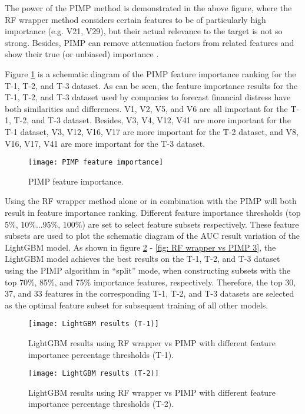 \documentclass[review]{elsarticle}
\begin{document}
The power of the PIMP method is demonstrated in the above figure, where the RF wrapper method considers certain features to be of particularly high importance (e.g. V21, V29), but their actual relevance to the target is not so strong. Besides, PIMP can remove attenuation factors from related features and show their true (or unbiased) importance \citep{Altmann2010}.

Figure \ref{fig: PIMP Feature Importance} is a schematic diagram of the PIMP feature importance ranking for the T-1, T-2, and T-3 dataset. As can be seen, the feature importance results for the T-1, T-2, and T-3 dataset used by companies to forecast financial distress have both similarities and differences. V1, V2, V5, and V6 are all important for the T-1, T-2, and T-3 dataset. Besides, V3, V4, V12, V41 are more important for the T-1 dataset, V3, V12, V16, V17 are more important for the T-2 dataset, and V8, V16, V17, V41 are more important for the T-3 dataset.

\begin{figure}[H]
    \centering
    \texttt{[image: PIMP feature importance]}
    \caption{PIMP feature importance.}
    \label{fig: PIMP Feature Importance}
\end{figure}

Using the RF wrapper method alone or in combination with the PIMP will both result in feature importance ranking. Different feature importance thresholds (top 5\%, 10\%...95\%, 100\%) are set to select feature subsets respectively. These feature subsets are used to plot the schematic diagram of the AUC result variation of the LightGBM model. As shown in figure \ref{fig: RF wrapper vs PIMP 1} - \ref{fig: RF wrapper vs PIMP 3}, the LightGBM model achieves the best results on the T-1, T-2, and T-3 dataset using the PIMP algorithm in ``split'' mode, when constructing subsets with the top 70\%, 85\%, and 75\% importance features, respectively. Therefore, the top 30, 37, and 33 features in the corresponding T-1, T-2, and T-3 datasets are selected as the optimal feature subset for subsequent training of all other models.

\begin{figure}[H]
    \centering
    \texttt{[image: LightGBM results (T-1)]}
    \caption{LightGBM results using RF wrapper vs PIMP with different feature importance percentage thresholds (T-1).}
    \label{fig: RF wrapper vs PIMP 1}
\end{figure}

\begin{figure}[H]
    \centering
    \texttt{[image: LightGBM results (T-2)]}
    \caption{LightGBM results using RF wrapper vs PIMP with different feature importance percentage thresholds (T-2).}
    \label{fig: RF wrapper vs PIMP 2}
\end{figure}
\end{document}
